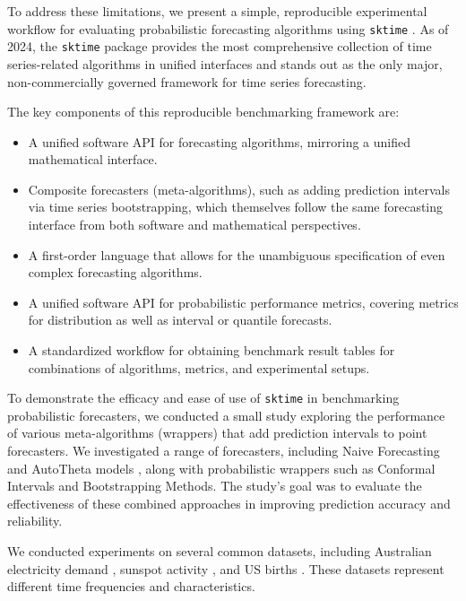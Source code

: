 To address these limitations, we present a simple, reproducible experimental workflow for evaluating probabilistic forecasting algorithms using \texttt{sktime} \cite{franz_kiraly_2024_11095261_sktime}. As of 2024, the \texttt{sktime} package provides the most comprehensive collection of time series-related algorithms in unified interfaces and stands out as the only major, non-commercially governed framework for time series forecasting.

The key components of this reproducible benchmarking framework are:

\begin{itemize}
  \item A unified software API for forecasting algorithms, mirroring a unified mathematical interface.
  \item Composite forecasters (meta-algorithms), such as adding prediction intervals via time series bootstrapping, which themselves follow the same forecasting interface from both software and mathematical perspectives.
  \item A first-order language that allows for the unambiguous specification of even complex forecasting algorithms.
  \item A unified software API for probabilistic performance metrics, covering metrics for distribution as well as interval or quantile forecasts.
  \item A standardized workflow for obtaining benchmark result tables for combinations of algorithms, metrics, and experimental setups.
\end{itemize}

To demonstrate the efficacy and ease of use of \texttt{sktime} in benchmarking probabilistic forecasters, we conducted a small study exploring the performance of various meta-algorithms (wrappers) that add prediction intervals to point forecasters. We investigated a range of forecasters, including Naive Forecasting and AutoTheta models \cite{autotheta}, along with probabilistic wrappers such as Conformal Intervals and Bootstrapping Methods. The study's goal was to evaluate the effectiveness of these combined approaches in improving prediction accuracy and reliability.

We conducted experiments on several common datasets, including Australian electricity demand \cite{Godahewa2021Australian}, sunspot activity \cite{Godahewa2021Sunspot}, and US births \cite{Godahewa2021USBirth}. These datasets represent different time frequencies and characteristics.

